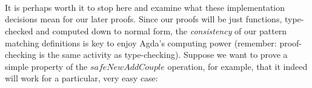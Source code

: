 {\begin{code}
\AgdaSymbol{(}\AgdaSpace{}%
\AgdaOperator{\AgdaInductiveConstructor{,}}\AgdaSpace{}%
\AgdaSymbol{)}\AgdaSpace{}%
\AgdaSpace{}%
\AgdaSymbol{(}\AgdaSpace{}%
\AgdaOperator{\AgdaInductiveConstructor{,}}\AgdaSpace{}%
\AgdaSymbol{)}\AgdaSpace{}%
\AgdaSpace{}%
\AgdaInductiveConstructor{[]}\<%
\\
\>[0]\AgdaSpace{}%
\AgdaSymbol{(}\AgdaSpace{}%
\AgdaOperator{\AgdaInductiveConstructor{,}}\AgdaSpace{}%
\AgdaSymbol{)}\AgdaSpace{}%
\AgdaSymbol{((}\AgdaSpace{}%
\AgdaOperator{\AgdaInductiveConstructor{,}}\AgdaSpace{}%
\AgdaSymbol{)}\AgdaSpace{}%
\AgdaSpace{}%
\AgdaSymbol{(}\AgdaSpace{}%
\AgdaSpace{}%
\AgdaSymbol{))}\AgdaSpace{}%
\AgdaSpace{}%
\AgdaSpace{}%
\AgdaSpace{}%
\<%
\\
\>[0]\AgdaSpace{}%
\AgdaSymbol{|}\AgdaSpace{}%
\AgdaSpace{}%
\AgdaSymbol{\AgdaUnderscore{}}\AgdaSpace{}%
\AgdaSymbol{=}\AgdaSpace{}%
\AgdaSymbol{(}\AgdaSpace{}%
\AgdaOperator{\AgdaInductiveConstructor{,}}\AgdaSpace{}%
\AgdaSymbol{)}\AgdaSpace{}%
\AgdaSpace{}%
\AgdaSpace{}%
\AgdaSpace{}%
\<%
\\
\>[0]\AgdaSpace{}%
\AgdaSymbol{|}\AgdaSpace{}%
\AgdaSymbol{\AgdaUnderscore{}}%
\>[14]\AgdaSymbol{=}\AgdaSpace{}%
\AgdaSymbol{(}\AgdaSpace{}%
\AgdaOperator{\AgdaInductiveConstructor{,}}\AgdaSpace{}%
\AgdaSymbol{)}\AgdaSpace{}%
\AgdaSpace{}%
\AgdaSpace{}%
\AgdaSymbol{(}\AgdaSpace{}%
\AgdaOperator{\AgdaInductiveConstructor{,}}\AgdaSpace{}%
\AgdaSymbol{)}\AgdaSpace{}%
\AgdaSymbol{(}\AgdaSpace{}%
\AgdaSpace{}%
\AgdaSymbol{)}\<%
\end{code}

It is perhaps worth it to stop here and examine what these implementation decisions mean for our later proofs. Since our proofs will be just functions, type-checked and computed down to normal form, the \emph{consistency} of our pattern matching definitions is key to enjoy Agda's computing power (remember: proof-checking is the same activity as type-checking). Suppose we want to prove a simple property of the $safeNewAddCouple$ operation, for example, that it indeed will work for a particular, very easy case:

}
